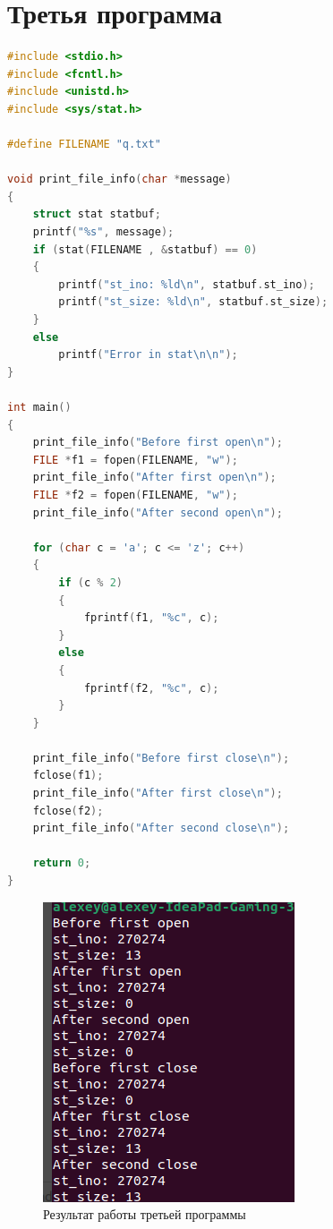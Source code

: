 \documentclass[12pt]{report}
\begin{document}
\chapter{Третья программа}

\begin{lstlisting}[language=c, label=p3, caption=Третья программа]
#include <stdio.h>
#include <fcntl.h>
#include <unistd.h>
#include <sys/stat.h>

#define FILENAME "q.txt"

void print_file_info(char *message)
{
    struct stat statbuf;
    printf("%s", message);
    if (stat(FILENAME , &statbuf) == 0)
    {
        printf("st_ino: %ld\n", statbuf.st_ino);
        printf("st_size: %ld\n", statbuf.st_size);
    }
    else
        printf("Error in stat\n\n");
}

int main()
{
    print_file_info("Before first open\n");
    FILE *f1 = fopen(FILENAME, "w");
    print_file_info("After first open\n");
    FILE *f2 = fopen(FILENAME, "w");
    print_file_info("After second open\n");

    for (char c = 'a'; c <= 'z'; c++)
    {
        if (c % 2)
        {
            fprintf(f1, "%c", c);
        }
        else
        {
            fprintf(f2, "%c", c);
        }
    }

    print_file_info("Before first close\n");
    fclose(f1);
    print_file_info("After first close\n");
    fclose(f2);
    print_file_info("After second close\n");

    return 0;
}

\end{lstlisting}


\begin{figure}[H]
	\centering
	\includegraphics[scale=0.8]{3out.png}
	\caption{Результат работы третьей программы}
	\label{fig:prog_03}
\end{figure}
\end{document}
